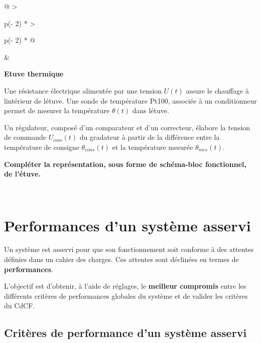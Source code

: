 \begin{longtable}[]{@{}
  >{\raggedright\arraybackslash}p{(\columnwidth - 2\tabcolsep) * }
  >{\raggedright\arraybackslash}p{(\columnwidth - 2\tabcolsep) * }@{}}
\toprule\noalign{}
\begin{minipage}[b]{\linewidth}\raggedright
\begin{quote}
\end{quote}
\end{minipage} & \begin{minipage}[b]{\linewidth}\raggedright
{}\textbf{Etuve
thermique}

Une résistance électrique alimentée par une tension \(U(t)\) assure le
chauffage à l\textquotesingle intérieur de l\textquotesingle étuve. Une
sonde de température Pt100, associée à un conditionneur permet de
mesurer la température \(\theta(t)\) dans l\textquotesingle étuve.

Un régulateur, composé d'un comparateur et d'un correcteur, élabore la
tension de commande \(U_{com}(t)\) du gradateur à partir de la
différence entre la température de consigne \(\theta_{cons}(t)\) et la
température mesurée \(\theta_{mes}(t)\).

\textbf{Compléter la représentation, sous forme de schéma-bloc
fonctionnel, de l'étuve.}

\SASchemaEtuve
\end{minipage} \\
\midrule\noalign{}
\endhead
\bottomrule\noalign{}
\endlastfoot
\end{longtable}

\section{Performances d'un système
asservi}\label{performances-dun-systuxe8me-asservi}

Un système est asservi pour que son fonctionnement soit conforme à des
attentes définies dans un cahier des charges. Ces attentes sont
déclinées en termes de \textbf{performances}.

L'objectif est d'obtenir, à l'aide de réglages, le \textbf{meilleur
compromis} entre les différents critères de performances globales du
système et de valider les critères du CdCF.

\subsection{Critères de performance d'un système
asservi}\label{crituxe8res-de-performance-dun-systuxe8me-asservi}

